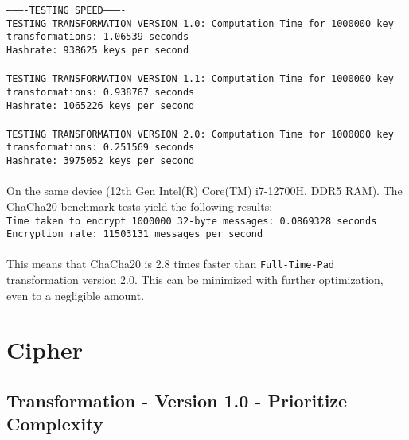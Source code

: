 \documentclass[fleqn, a4paper,12pt]{article}
\begin{document}
\texttt{----------TESTING SPEED----------\\
TESTING TRANSFORMATION VERSION 1.0: Computation Time for 1000000 key transformations: 1.06539 seconds\\
Hashrate: 938625 keys per second\\
\\
TESTING TRANSFORMATION VERSION 1.1: Computation Time for 1000000 key transformations: 0.938767 seconds\\
Hashrate: 1065226 keys per second\\
\\
TESTING TRANSFORMATION VERSION 2.0: Computation Time for 1000000 key transformations: 0.251569 seconds\\
Hashrate: 3975052 keys per second\\
}
\\
On the same device (12th Gen Intel(R) Core(TM) i7-12700H, DDR5 RAM). The ChaCha20 benchmark tests yield the following results:\\
\texttt{Time taken to encrypt 1000000 32-byte messages: 0.0869328 seconds\\
Encryption rate: 11503131 messages per second}\\
\\
This means that ChaCha20 is 2.8 times faster than \texttt{Full-Time-Pad} transformation version 2.0. This can be minimized with further optimization, even to a negligible amount.\\

\section {Cipher}

\subsection{Transformation - Version 1.0 - Prioritize Complexity}
\end{document}
